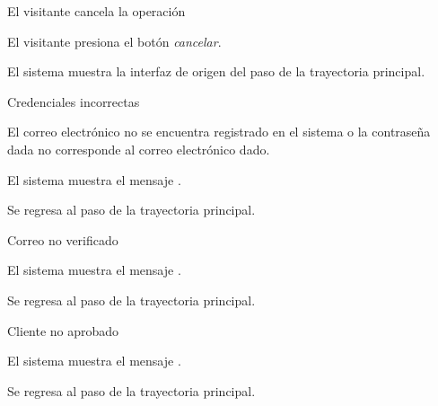 {\begin{trayectoriaPrincipal}
  \end{trayectoriaPrincipal}

  \begin{trayectoriaAlternativa}[ta:cancelar]
    {El visitante cancela la operación}

    \item El visitante presiona el botón \textit{cancelar}.

    \item El sistema muestra la interfaz de origen del paso
       de la trayectoria principal.

  \end{trayectoriaAlternativa}

  \begin{trayectoriaAlternativa}
    {Credenciales incorrectas}

    \item El correo electrónico no se encuentra registrado en el sistema o la
      contraseña dada no corresponde al correo electrónico dado.

    \item El sistema muestra el mensaje
      .

    \item Se regresa al paso  de la trayectoria
      principal.

  \end{trayectoriaAlternativa}

  \begin{trayectoriaAlternativa}
    {Correo no verificado}

    \item El sistema muestra el mensaje
      .

    \item Se regresa al paso  de la trayectoria
      principal.

  \end{trayectoriaAlternativa}

  \begin{trayectoriaAlternativa}
    {Cliente no aprobado}

    \item El sistema muestra el mensaje
      .

    \item Se regresa al paso  de la trayectoria
      principal.


\end{trayectoriaAlternativa}}

